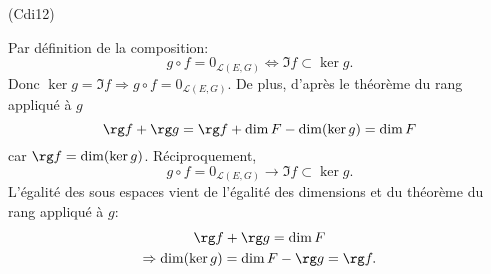 \begin{tiny}(Cdi12)\end{tiny} Par définition de la composition:
\[
  g\circ f = 0_{\mathcal{L}(E,G)}
  \Leftrightarrow
  \Im f \subset \ker g .
\]
Donc $\ker g = \Im f \Rightarrow g\circ f = 0_{\mathcal{L}(E,G)}$. De plus, d'après le théorème du rang appliqué à $g$
\[
  \rg f + \rg g = \rg f + \dim F - \dim(\ker g)
  = \dim F
\]
car $\rg f = \dim(\ker g)$.\newline
Réciproquement, 
\[
  g\circ f = 0_{\mathcal{L}(E,G)}
  \rightarrow
  \Im f \subset \ker g .
\]
L'égalité des sous espaces vient de l'égalité des dimensions et du théorème du rang appliqué à $g$:
\begin{multline*}
  \rg f + \rg g = \dim F \\
  \Rightarrow \dim(\ker g) = \dim F - \rg g = \rg f.
\end{multline*}
